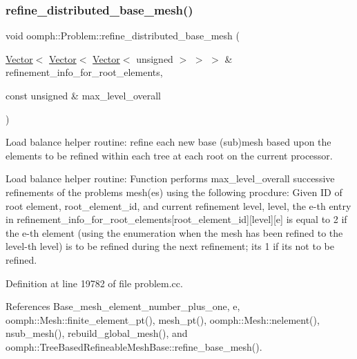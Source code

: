 \mbox{\label{classoomph_1_1Problem_ac969abcf440b4f631061e74316391b3a}} 
\subsubsection{\texorpdfstring{refine\+\_\+distributed\+\_\+base\+\_\+mesh()}{refine\_distributed\_base\_mesh()}}
{\footnotesize\ttfamily void oomph\+::\+Problem\+::refine\+\_\+distributed\+\_\+base\+\_\+mesh (\begin{DoxyParamCaption}\item[{\hyperlink{classoomph_1_1Vector}{Vector}$<$ \hyperlink{classoomph_1_1Vector}{Vector}$<$ \hyperlink{classoomph_1_1Vector}{Vector}$<$ unsigned $>$ $>$ $>$ \&}]{refinement\+\_\+info\+\_\+for\+\_\+root\+\_\+elements,  }\item[{const unsigned \&}]{max\+\_\+level\+\_\+overall }\end{DoxyParamCaption})}



Load balance helper routine\+: refine each new base (sub)mesh based upon the elements to be refined within each tree at each root on the current processor. 

Load balance helper routine\+: Function performs max\+\_\+level\+\_\+overall successive refinements of the problem\textquotesingle{}s mesh(es) using the following procdure\+: Given ID of root element, root\+\_\+element\+\_\+id, and current refinement level, level, the e-\/th entry in refinement\+\_\+info\+\_\+for\+\_\+root\+\_\+elements\mbox{[}root\+\_\+element\+\_\+id\mbox{]}\mbox{[}level\mbox{]}\mbox{[}e\mbox{]} is equal to 2 if the e-\/th element (using the enumeration when the mesh has been refined to the level-\/th level) is to be refined during the next refinement; it\textquotesingle{}s 1 if it\textquotesingle{}s not to be refined. 

Definition at line 19782 of file problem.\+cc.



References Base\+\_\+mesh\+\_\+element\+\_\+number\+\_\+plus\+\_\+one, e, oomph\+::\+Mesh\+::finite\+\_\+element\+\_\+pt(), mesh\+\_\+pt(), oomph\+::\+Mesh\+::nelement(), nsub\+\_\+mesh(), rebuild\+\_\+global\+\_\+mesh(), and oomph\+::\+Tree\+Based\+Refineable\+Mesh\+Base\+::refine\+\_\+base\+\_\+mesh().




